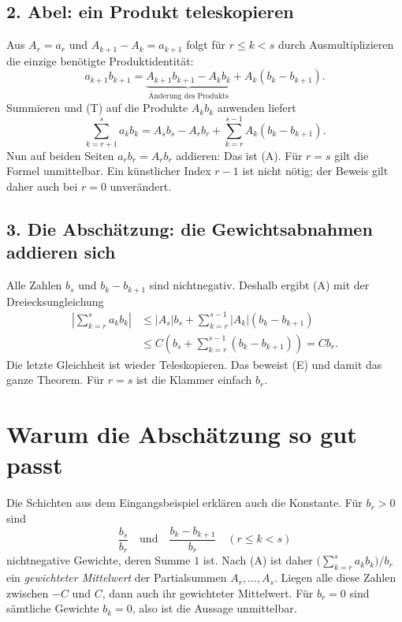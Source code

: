 \subsection*{2. Abel: ein Produkt teleskopieren}

Aus $A_r=a_r$ und $A_{k+1}-A_k=a_{k+1}$ folgt für $r\leq k<s$
durch Ausmultiplizieren die einzige benötigte Produktidentität:
\begin{equation}\tag{P}\label{abel:product}
 a_{k+1}b_{k+1}
 =\underbrace{A_{k+1}b_{k+1}-A_kb_k}_{\text{Änderung des Produkts}}
   +A_k(b_k-b_{k+1}).
\end{equation}
Summieren und (T) auf die Produkte $A_kb_k$ anwenden liefert
\[
 \sum_{k=r+1}^{s}a_kb_k
 =A_sb_s-A_rb_r+\sum_{k=r}^{s-1}A_k(b_k-b_{k+1}).
\]
Nun auf beiden Seiten $a_rb_r=A_rb_r$ addieren: Das ist (A).
Für $r=s$ gilt die Formel unmittelbar. Ein künstlicher Index $r-1$
ist nicht nötig; der Beweis gilt daher auch bei $r=0$ unverändert.

\subsection*{3. Die Abschätzung: die Gewichtsabnahmen addieren sich}

Alle Zahlen $b_s$ und $b_k-b_{k+1}$ sind nichtnegativ. Deshalb ergibt
(A) mit der Dreiecksungleichung
\begin{align*}
 \left|\sum_{k=r}^{s}a_kb_k\right|
 &\leq |A_s|b_s+\sum_{k=r}^{s-1}|A_k|(b_k-b_{k+1})\\
 &\leq C\left(b_s+\sum_{k=r}^{s-1}(b_k-b_{k+1})\right)
  =Cb_r.
\end{align*}
Die letzte Gleichheit ist wieder Teleskopieren. Das beweist (E)
und damit das ganze Theorem. Für $r=s$ ist die Klammer einfach $b_r$.

\section{Warum die Abschätzung so gut passt}

Die Schichten aus dem Eingangsbeispiel erklären auch die Konstante.
Für $b_r>0$ sind
\[
 \frac{b_s}{b_r}\quad\text{und}\quad
 \frac{b_k-b_{k+1}}{b_r}\quad(r\leq k<s)
\]
nichtnegative Gewichte, deren Summe $1$ ist. Nach (A) ist daher
$\bigl(\sum_{k=r}^{s}a_kb_k\bigr)/b_r$ ein \emph{gewichteter
Mittelwert} der Partialsummen $A_r,\ldots,A_s$.
Liegen alle diese Zahlen zwischen $-C$ und $C$, dann auch ihr
gewichteter Mittelwert. Für $b_r=0$ sind sämtliche Gewichte $b_k=0$,
also ist die Aussage unmittelbar.


